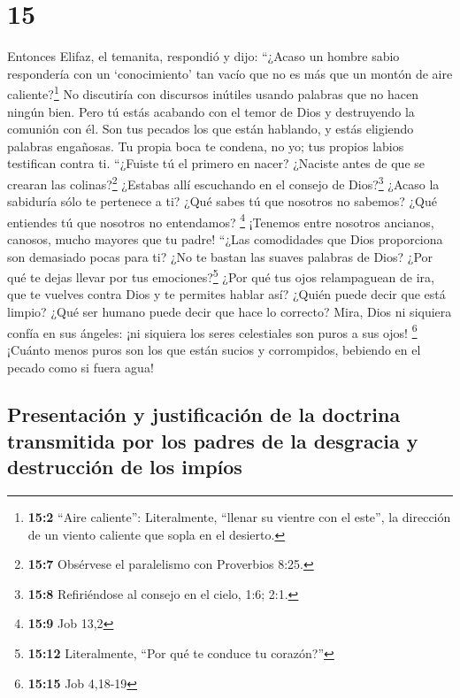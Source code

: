 \hypertarget{section-14}{%
\section{15}\label{section-14}}

 Entonces Elifaz, el temanita, respondió y dijo:
 ``¿Acaso un hombre sabio respondería con un
`conocimiento' tan vacío que no es más que un montón de aire
caliente?\footnote{\textbf{15:2} ``Aire caliente'': Literalmente,
  ``llenar su vientre con el este'', la dirección de un viento caliente
  que sopla en el desierto.}  No discutiría con discursos
inútiles usando palabras que no hacen ningún bien.  Pero
tú estás acabando con el temor de Dios y destruyendo la comunión con él.
 Son tus pecados los que están hablando, y estás eligiendo
palabras engañosas.  Tu propia boca te condena, no yo; tus
propios labios testifican contra ti.  ``¿Fuiste tú el
primero en nacer? ¿Naciste antes de que se crearan las
colinas?\footnote{\textbf{15:7} Obsérvese el paralelismo con Proverbios
  8:25.}  ¿Estabas allí escuchando en el consejo de
Dios?\footnote{\textbf{15:8} Refiriéndose al consejo en el cielo, 1:6;
  2:1.} ¿Acaso la sabiduría sólo te pertenece a ti?  ¿Qué
sabes tú que nosotros no sabemos? ¿Qué entiendes tú que nosotros no
entendamos? \footnote{\textbf{15:9} Job 13,2}  ¡Tenemos
entre nosotros ancianos, canosos, mucho mayores que tu padre!
 ``¿Las comodidades que Dios proporciona son demasiado
pocas para ti? ¿No te bastan las suaves palabras de Dios?
 ¿Por qué te dejas llevar por tus emociones?\footnote{\textbf{15:12}
  Literalmente, ``Por qué te conduce tu corazón?''}  ¿Por
qué tus ojos relampaguean de ira, que te vuelves contra Dios y te
permites hablar así?  ¿Quién puede decir que está limpio?
¿Qué ser humano puede decir que hace lo correcto?  Mira,
Dios ni siquiera confía en sus ángeles: ¡ni siquiera los seres
celestiales son puros a sus ojos! \footnote{\textbf{15:15} Job 4,18-19}
 ¡Cuánto menos puros son los que están sucios y
corrompidos, bebiendo en el pecado como si fuera agua!

\hypertarget{presentaciuxf3n-y-justificaciuxf3n-de-la-doctrina-transmitida-por-los-padres-de-la-desgracia-y-destrucciuxf3n-de-los-impuxedos}{%
\subsection{Presentación y justificación de la doctrina transmitida por
los padres de la desgracia y destrucción de los
impíos}\label{presentaciuxf3n-y-justificaciuxf3n-de-la-doctrina-transmitida-por-los-padres-de-la-desgracia-y-destrucciuxf3n-de-los-impuxedos}}

